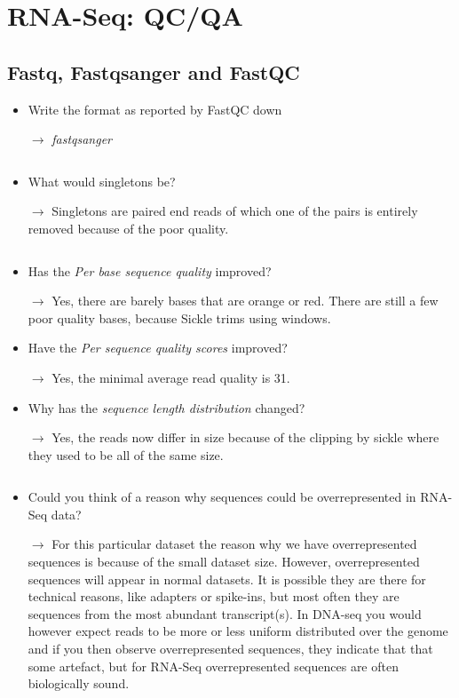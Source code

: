 \section{RNA-Seq: QC/QA}

\subsection{Fastq, Fastqsanger and FastQC}

\begin{itemize}
	\item Write the format as reported by FastQC down
	\item[$\rightarrow$] \textit{fastqsanger}
	\item[$$]
	\item What would singletons be?
	\item[$\rightarrow$] Singletons are paired end reads of which one of the pairs is entirely removed because of the poor quality.
	\item[$$]
	\item Has the \textit{Per base sequence quality} improved?
	\item[$\rightarrow$] Yes, there are barely bases that are orange or red. There are still a few poor quality bases, because Sickle trims using windows.
	\item Have the \textit{Per sequence quality scores} improved?
	\item[$\rightarrow$] Yes, the minimal average read quality is 31.
	\item Why has the \textit{sequence length distribution} changed?
	\item[$\rightarrow$] Yes, the reads now differ in size because of the clipping by sickle where they used to be all of the same size.
	\item[$$]
	\item Could you think of a reason why sequences could be overrepresented in RNA-Seq data?
	\item[$\rightarrow$] For this particular dataset the reason why we have overrepresented sequences is because of the small dataset size.
	However, overrepresented sequences will appear in normal datasets.
	It is possible they are there for technical reasons, like adapters or spike-ins, but most often they are sequences from the most abundant transcript(s).
	In DNA-seq you would however expect reads to be more or less uniform distributed over the genome and if you then observe overrepresented sequences, they indicate that that some artefact, but for RNA-Seq overrepresented sequences are often biologically sound.
\end{itemize}
